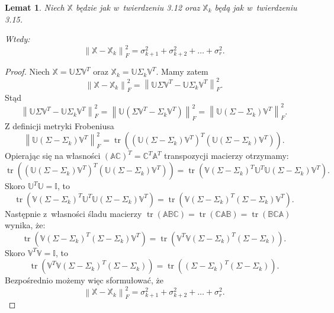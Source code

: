 \documentclass[12pt,a4paper]{report}
\newtheorem{lemat}[df]{Lemat}
\newcommand{\norma}[1]{\left\| {#1} \right\|}
\newcommand{\tr}[1]{\operatorname{tr}\left({#1} \right)}
\begin{document}
\begin{lemat}
Niech $\mathbb{X}$ będzie jak w~twierdzeniu 3.12 oraz $\mathbb{X}_k$ będą jak w~twierdzeniu 3.15.

Wtedy:
$$
\norma{ \mathbb{X} - \mathbb{X}_k}_F^2 = \sigma_{k+1}^2 + \sigma_{k+2}^2 + \ldots + \sigma_{r}^2.
$$
\end{lemat}
\begin{proof}
Niech $\mathbb{X}=\mathbb{U} \Sigma \mathbb{V}^T$ oraz $\mathbb{X}_k=\mathbb{U} \Sigma_k \mathbb{V}^T$.
Mamy zatem
$$
\norma{ \mathbb{X} - \mathbb{X}_k}_F^2 =
\norma{\mathbb{U} \Sigma \mathbb{V}^T - \mathbb{U} \Sigma_k \mathbb{V}^T}_F^2.
$$
Stąd
$$
\norma{\mathbb{U} \Sigma \mathbb{V}^T - \mathbb{U} \Sigma_k \mathbb{V}^T}_F^2 = 
\norma{\mathbb{U} (\Sigma \mathbb{V}^T - \Sigma_k \mathbb{V}^T)}_F^2 = 
\norma{\mathbb{U} (\Sigma - \Sigma_k) \mathbb{V}^T}_F^2.
$$
Z definicji metryki Frobeniusa
$$
\norma{\mathbb{U} (\Sigma - \Sigma_k) \mathbb{V}^T}_F^2 = 
\tr{(\mathbb{U} (\Sigma - \Sigma_k) \mathbb{V}^T)^T (\mathbb{U} (\Sigma - \Sigma_k) \mathbb{V}^T)}.
$$
Opierając się na własności $(\mathbb{A}\mathbb{C})^T = \mathbb{C}^T \mathbb{A}^T$ transpozycji macierzy otrzymamy:
$$
\tr{(\mathbb{U} (\Sigma - \Sigma_k) \mathbb{V}^T)^T (\mathbb{U} (\Sigma - \Sigma_k) \mathbb{V}^T)} = \tr{\mathbb{V} (\Sigma - \Sigma_k)^T \mathbb{U}^T \mathbb{U} (\Sigma - \Sigma_k) \mathbb{V}^T}.
$$
Skoro $\mathbb{U}^T \mathbb{U} = \mathbb{I}$, to
$$
\tr{\mathbb{V} (\Sigma - \Sigma_k)^T \mathbb{U}^T \mathbb{U} (\Sigma - \Sigma_k) \mathbb{V}^T} = 
\tr{\mathbb{V} (\Sigma - \Sigma_k)^T (\Sigma - \Sigma_k) \mathbb{V}^T}.
$$
Następnie z~własności śladu macierzy $\tr{\mathbb{A} \mathbb{B} \mathbb{C}}  = \tr{\mathbb{C} \mathbb{A} \mathbb{B}} = \tr{\mathbb{B} \mathbb{C} \mathbb{A}}$ wynika, że:
$$
\tr{\mathbb{V} (\Sigma - \Sigma_k)^T (\Sigma - \Sigma_k) \mathbb{V}^T} = \tr{\mathbb{V}^T \mathbb{V} (\Sigma - \Sigma_k)^T (\Sigma - \Sigma_k)}.
$$ 
Skoro $\mathbb{V}^T \mathbb{V} = \mathbb{I}$, to
$$
\tr{\mathbb{V}^T \mathbb{V} (\Sigma - \Sigma_k)^T (\Sigma - \Sigma_k)} = \tr{(\Sigma - \Sigma_k)^T (\Sigma - \Sigma_k) }.
$$
Bezpośrednio możemy więc sformułować, że
$$
\norma{ \mathbb{X} - \mathbb{X}_k}_F^2 = \sigma_{k+1}^2 + \sigma_{k+2}^2 + \ldots + \sigma_{r}^2.
$$
\end{proof}
\end{document}
